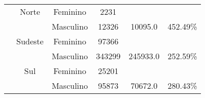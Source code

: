 \begin{table}[htbp]
\begin{center}
\begin{tabular}{|c|c|c|c|c|c|}
			             & Norte            & Feminino      & 2231           &              &                \\
			             &                  & Masculino     & 12326          & 10095.0      & 452.49\%       \\
			             & Sudeste          & Feminino      & 97366          &              &                \\
			             &                  & Masculino     & 343299         & 245933.0     & 252.59\%       \\
			             & Sul              & Feminino      & 25201          &              &                \\
			             &                  & Masculino     & 95873          & 70672.0      & 280.43\%       \\
			\hline
		\end{tabular}
		\label{deligTotal}
	\end{center}
\end{table}